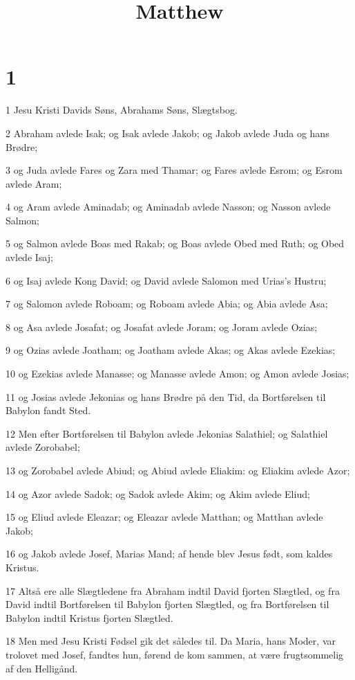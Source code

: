 

\title{Matthew}


\chapter{1}

\par 1 Jesu Kristi Davids Søns, Abrahams Søns, Slægtsbog.
\par 2 Abraham avlede Isak; og Isak avlede Jakob; og Jakob avlede Juda og hans Brødre;
\par 3 og Juda avlede Fares og Zara med Thamar; og Fares avlede Esrom; og Esrom avlede Aram;
\par 4 og Aram avlede Aminadab; og Aminadab avlede Nasson; og Nasson avlede Salmon;
\par 5 og Salmon avlede Boas med Rakab; og Boas avlede Obed med Ruth; og Obed avlede Isaj;
\par 6 og Isaj avlede Kong David; og David avlede Salomon med Urias's Hustru;
\par 7 og Salomon avlede Roboam; og Roboam avlede Abia; og Abia avlede Asa;
\par 8 og Asa avlede Josafat; og Josafat avlede Joram; og Joram avlede Ozias;
\par 9 og Ozias avlede Joatham; og Joatham avlede Akas; og Akas avlede Ezekias;
\par 10 og Ezekias avlede Manasse; og Manasse avlede Amon; og Amon avlede Josias;
\par 11 og Josias avlede Jekonias og hans Brødre på den Tid, da Bortførelsen til Babylon fandt Sted.
\par 12 Men efter Bortførelsen til Babylon avlede Jekonias Salathiel; og Salathiel avlede Zorobabel;
\par 13 og Zorobabel avlede Abiud; og Abiud avlede Eliakim: og Eliakim avlede Azor;
\par 14 og Azor avlede Sadok; og Sadok avlede Akim; og Akim avlede Eliud;
\par 15 og Eliud avlede Eleazar; og Eleazar avlede Matthan; og Matthan avlede Jakob;
\par 16 og Jakob avlede Josef, Marias Mand; af hende blev Jesus født, som kaldes Kristus.
\par 17 Altså ere alle Slægtledene fra Abraham indtil David fjorten Slægtled, og fra David indtil Bortførelsen til Babylon fjorten Slægtled, og fra Bortførelsen til Babylon indtil Kristus fjorten Slægtled.
\par 18 Men med Jesu Kristi Fødsel gik det således til. Da Maria, hans Moder, var trolovet med Josef, fandtes hun, førend de kom sammen, at være frugtsommelig af den Helligånd.
